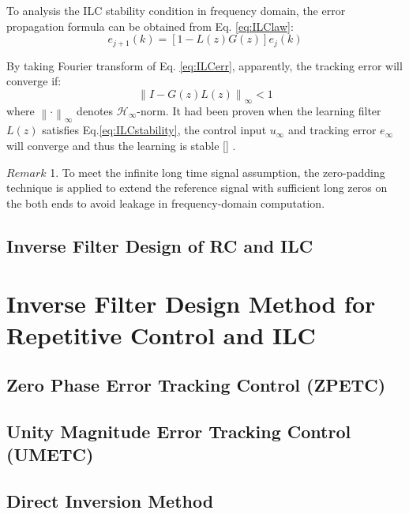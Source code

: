 To analysis the ILC stability condition in frequency domain, the error propagation formula can be obtained from Eq. \ref{eq:ILClaw}:
\begin{equation}
e_{j+1}(k)= [1-L(z)G(z)]e_j(k)
\label{eq:ILCerr}
\end{equation}

By taking Fourier transform of Eq. \ref{eq:ILCerr}, apparently, the tracking error will converge if:
\begin{equation}
\left \| I-G(z)L(z) \right \|_\infty<1
\label{eq:ILCstability}
\end{equation}
where $\left \| \cdot  \right \|_\infty$ denotes $\mathcal{H}_\infty$-norm. It had been proven when the learning filter $L(z)$ satisfies Eq.\ref{eq:ILCstability}, the control input $u_\infty$ and tracking error $e_\infty$ will converge and thus the learning is stable [\cite{norrlof2002time}] . 

{$Remark$ 1.}
To meet the infinite long time signal assumption, the zero-padding technique is applied to extend the reference signal with sufficient long zeros on the both ends to avoid leakage in frequency-domain computation.   


\subsection{Inverse Filter Design of RC and ILC}
\label{sec: Inverse Filter Design of RC and ILC}


\section{Inverse Filter Design Method for Repetitive Control and ILC}

\subsection{Zero Phase Error Tracking Control (ZPETC)}
\label{sec: Zero Phase Error Tracking Control (ZPETC)}

\subsection{Unity Magnitude Error Tracking Control (UMETC)}
\label{sec: Unity Magnitude Error Tracking Control (UMETC)}

\subsection{Direct Inversion Method}
\label{sec: Direct Inversion Method}

